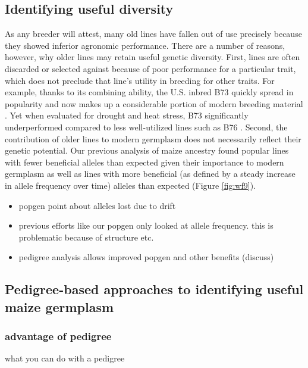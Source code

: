 \documentclass[draft,12pt]{article}
\begin{document}
\subsection*{Identifying useful diversity}
As any breeder will attest, many old lines have fallen out of use precisely because they showed inferior agronomic performance.
There are a number of reasons, however, why older lines may retain useful genetic diversity.
First, lines are often discarded or selected against because of poor performance for a particular trait, which does not preclude that line's utility in breeding for other traits.
For example, thanks to its combining ability, the U.S. inbred B73 quickly spread in popularity and now makes up a considerable portion of modern breeding material \citep{van2012historical}.
Yet when evaluated for drought and heat stress, B73 significantly underperformed compared to less well-utilized lines such as B76 \citep{chen2012characterization}.
Second, the contribution of older lines to modern germplasm does not necessarily reflect their genetic potential.
Our previous analysis of maize ancestry found popular lines with fewer beneficial alleles than expected given their importance to modern germplasm as well as lines with more beneficial (as defined by a steady increase in allele frequency over time) alleles than expected (Figure \ref{fig:wf9}).

\begin{itemize}
\item popgen point about alleles lost due to drift
\item previous efforts like our popgen only looked at allele frequency. this is problematic because of structure etc.
\item pedigree analysis allows improved popgen and other benefits (discuss)
\end{itemize}

\subsection*{Pedigree-based approaches to identifying useful maize germplasm}


\subsubsection*{advantage of pedigree}
\- what you can do with a pedigree
\end{document}
